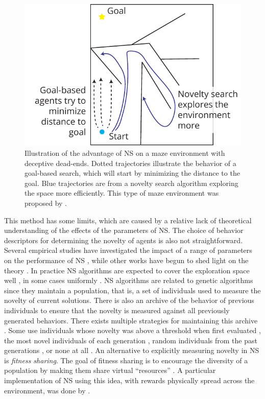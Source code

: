 \begin{figure}[htbp]
  \centering
  \includegraphics[width=.7\linewidth]{figures/novelty_search}
  \caption{Illustration of the advantage of \acf{NS} on a maze environment with
    deceptive dead-ends. Dotted trajectories illustrate the behavior of a
    goal-based search, which will start by minimizing the distance to the goal.
    Blue trajectories are from a novelty search algorithm exploring the space
    more efficiently. This type of maze environment was proposed by
    \textcite{lehmanAbandoningObjectivesEvolution2011}.}
\label{fig:novelty_search}
\end{figure}

This method has some limits, which are caused by a relative lack of theoretical
understanding of the effects of the parameters of \ac{NS}. The choice of
behavior descriptors for determining the novelty of agents is also not
straightforward. Several empirical studies have investigated the impact of a
range of parameters on the performance of \ac{NS}
\parencite{gomesDevisingEffectiveNovelty2015,
  kistemakerCriticalFactorsPerformance2011}, while other works have begun to
shed light on the theory \parencite{doncieuxNoveltySearchTheoretical2019}. In
practice \ac{NS} algorithms are expected to cover the exploration space well
\parencite{cullyQualityDiversityOptimization2017,pughQualityDiversityNew2016},
in some cases uniformly \parencite{gomesDevisingEffectiveNovelty2015}. \ac{NS}
algorithms are related to genetic algorithms since they maintain a population,
that is, a set of individuals used to measure the novelty of current solutions.
There is also an archive of the behavior of previous individuals to ensure that the
novelty is measured against all previously generated behaviors. There exists
multiple strategies for maintaining this archive
\parencite{gomesDevisingEffectiveNovelty2015}. Some use individuals whose
novelty was above a threshold when first evaluated
\parencite{lehmanAbandoningObjectivesEvolution2011}, the most novel individuals
of each generation \parencite{liapisConstrainedNoveltySearch2015}, random
individuals from the past generations
\parencite{lehmanEfficientlyEvolvingPrograms2010}, or none at all
\parencite{mouretEncouragingBehavioralDiversity2012}. An alternative to
explicitly measuring novelty in \ac{NS} is \emph{fitness sharing}. The goal of
fitness sharing is to encourage the diversity of a population by making them
share virtual ``resources'' \parencite{goldbergSimpleGeneticAlgorithms1987,
  hollandAdaptationNaturalArtificial1992}. A particular implementation of
\ac{NS} using this idea, with rewards physically spread across the
environment, was done by \textcite{herelEmergenceNoveltyEvolutionary2022}.

